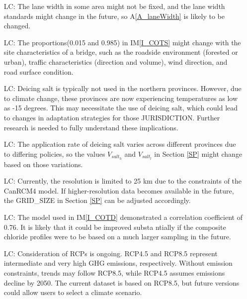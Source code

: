 \documentclass[12pt]{article}
\newcommand{\aref}[1]{A\ref{#1}}
\newcommand{\iref}[1]{IM\ref{#1}}
\newcounter{lcnum} %
\begin{document}
\noindent \begin{itemize}

\item[LC\refstepcounter{lcnum}\thelcnum\label{LC_laneWidth}:] The lane width in some area might not be fixed, and the lane width standards might change in the future, so \aref{A_laneWidth} is likely to be changed. 
\item[LC\refstepcounter{lcnum}\thelcnum\label{LC_SASC}:] The proportions(0.015 and 0.985) in \iref{I_COTS} might change with the site characteristics of a bridge, such as the roadside environment (forested or urban), traffic characteristics (direction and volume), wind direction, and road surface condition. 
\item[LC\refstepcounter{lcnum}\thelcnum\label{LC_northern}:] Deicing salt is typically not used in the northern provinces. However, due to climate change, these provinces are now experiencing temperatures as low as -15 degrees. This may necessitate the use of deicing salt, which could lead to changes in adaptation strategies for those JURISDICTION. Further research is needed to fully understand these implications.
\item[LC\refstepcounter{lcnum}\thelcnum\label{LC_salt}:] The application rate of deicing salt varies across different provinces due to differing policies, so the values $V_{salt_{h}}$ and $V_{salt_{l}}$ in Section \ref{SP} might change based on those variations.
\item[LC\refstepcounter{lcnum}\thelcnum\label{LC_resolution}:] Currently, the resolution is limited to 25 km due to the constraints of the CanRCM4 model. If higher-resolution data becomes available in the future, the GRID\_SIZE in Section \ref{SP} can be adjusted accordingly.
\item[LC\refstepcounter{lcnum}\thelcnum\label{LC_linearRegression}:] The model used in \iref{I_COTD} demonstrated a correlation coefficient of 0.76. It is likely that it could be improved substa ntially if the composite chloride profiles were to be based on a much larger sampling in the future.
\item[LC\refstepcounter{lcnum}\thelcnum\label{LC_RCP}:] Consideration of RCPs is ongoing. RCP4.5 and RCP8.5 represent intermediate and very high GHG emissions, respectively. Without emission constraints, trends may follow RCP8.5, while RCP4.5 assumes emissions decline by 2050. The current dataset is based on RCP8.5, but future versions could allow users to select a climate scenario.
\end{itemize}
\end{document}
